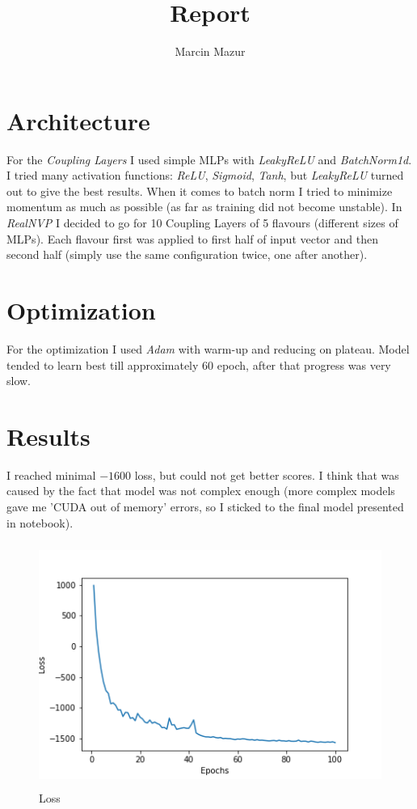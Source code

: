 \documentclass[a4paper]{article}
\title{Report}
\author{Marcin Mazur}
\begin{document}
\maketitle

\section{Architecture}
For the \textit{Coupling Layers} I used simple MLPs with \textit{LeakyReLU} and
\textit{BatchNorm1d}. I tried many activation functions: \textit{ReLU}, \textit{Sigmoid},
\textit{Tanh}, but \textit{LeakyReLU} turned out to give the best results. When it
comes to batch norm I tried to minimize momentum as much as possible (as far as training
did not become unstable). In \textit{RealNVP} I decided to go for 10 Coupling Layers of
5 flavours (different sizes of MLPs). Each flavour first was applied to first half of input
vector and then second half (simply use the same configuration twice, one after another).

\section{Optimization}
For the optimization I used \textit{Adam} with warm-up and reducing on plateau.
Model tended to learn best till approximately $60$ epoch, after that progress was very slow.
\newpage

\section{Results}
I reached minimal $-1600$ loss, but could not get better scores. I think that was
caused by the fact that model was not complex enough (more complex models
gave me 'CUDA out of memory' errors, so I sticked to the final model presented
in notebook).

\begin{figure}[H]
    \centering
    \includegraphics[height=8cm]{Loss_04-Jun-2022-18.png}
    \caption{Loss}
\end{figure}
\end{document}
